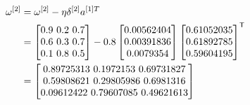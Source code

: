 \documentclass{article}
\begin{document}
\[
    \begin{aligned}
        \omega^{[2]} & =\omega^{[2]}-\eta\delta^{[2]}a^{[1]T} \\
                     & =\begin{bmatrix}
                            0.9 $ 0.2 $ 0.7 \\
                            0.6 $ 0.3 $ 0.7 \\
                            0.1 $ 0.8 $ 0.5 \\
                        \end{bmatrix}
        - 0.8 \begin{bmatrix}
                  0.00562404 \\
                  0.00391836 \\
                  0.0079354  \\
              \end{bmatrix}
        \begin{bmatrix}
            0.61052035 \\
            0.61892785 \\
            0.59604195 \\
        \end{bmatrix}^{\mathsf{T}}                      \\
                     & = \begin{bmatrix}
                             0.89725313 $ 0.1972153  $ 0.69731827 \\
                             0.59808621 $ 0.29805986 $ 0.6981316  \\
                             0.09612422 $ 0.79607085 $ 0.49621613 \\
                         \end{bmatrix}
    \end{aligned}
\]
\end{document}
